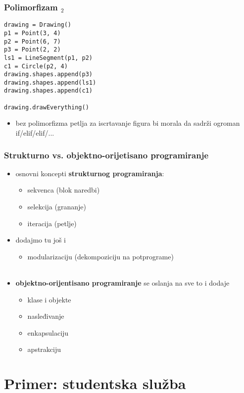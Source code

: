 \documentclass[utf8,compress,aspectratio=169]{beamer}
\begin{document}
\begin{frame}[fragile]
  \frametitle{Polimorfizam $_2$}
\begin{verbatim}
drawing = Drawing()
p1 = Point(3, 4)
p2 = Point(6, 7)
p3 = Point(2, 2)
ls1 = LineSegment(p1, p2)
c1 = Circle(p2, 4)
drawing.shapes.append(p3)
drawing.shapes.append(ls1)
drawing.shapes.append(c1)

drawing.drawEverything()
\end{verbatim}
  \begin{itemize}
    \item bez polimorfizma petlja za iscrtavanje figura bi morala da sadrži ogroman if/elif/elif/...
  \end{itemize}
\end{frame}

\begin{frame}[fragile]
  \frametitle{Strukturno vs. objektno-orijetisano programiranje}
  \begin{itemize}
    \item osnovni koncepti \textbf{strukturnog programiranja}:
    \begin{itemize}
      \item sekvenca (blok naredbi)
      \item selekcija (grananje)
      \item iteracija (petlje)
    \end{itemize}
    \item dodajmo tu još i
    \begin{itemize}
      \item modularizaciju (dekompoziciju na potprograme) \\ \ \\
    \end{itemize}
    \item \textbf{objektno-orijentisano programiranje} se oslanja na sve to i dodaje
    \begin{itemize}
      \item klase i objekte
      \item nasleđivanje
      \item enkapsulaciju
      \item apstrakciju
    \end{itemize}
  \end{itemize}
\end{frame}

\section[Primer]{Primer: studentska služba}
\end{document}
